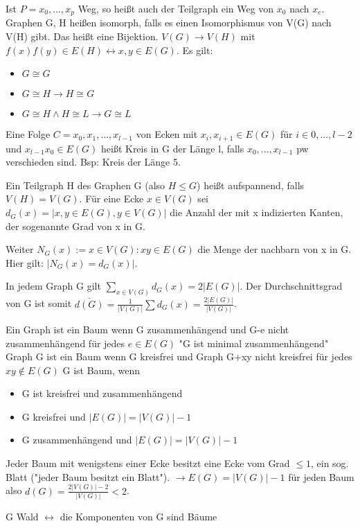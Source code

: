 \documentclass[a4paper]{article}
\begin{document}
\begin{multicols}{3}
    Ist $P=x_0,...,x_p$ Weg, so heißt auch der Teilgraph ein Weg von $x_0$ nach $x_e$.
    Graphen G, H heißen isomorph, falls es einen Isomorphismus von V(G) nach V(H) gibt. Das heißt eine Bijektion.
    $V(G)\rightarrow V(H)$ mit $f(x)f(y)\in E(H)\leftrightarrow x,y \in E(G)$. Es gilt:
    \begin{itemize}
        \item $G\cong G$
        \item $G\cong H \rightarrow H \cong G$
        \item $G\cong H \wedge H\cong L \rightarrow G\cong L$
    \end{itemize}
    
    Eine Folge $C=x_0,x_1,...,x_{l-1}$ von Ecken mit $x_i,x_{i+1}\in E(G)$ für $i\in {0,...,l-2}$ und $x_{l-1}x_0 \in E(G)$ heißt Kreis in G der Länge l, falls $x_0,...,x_{l-1}$ pw verschieden sind. Bsp: Kreis der Länge 5.
    
    Ein Teilgraph H des Graphen G (also $H\leq G$) heißt aufspannend, falls $V(H)=V(G)$. Für eine Ecke $x\in V(G)$ sei $d_G(x)=|{x,y\in E(G), y\in V(G)}|$ die Anzahl der mit x indizierten Kanten, der sogenannte Grad von x in G.
    
    Weiter $N_G(x):={x\in V(G): xy \in E(G)}$ die Menge der nachbarn von x in G. Hier gilt: $|N_G(x)=d_G(x)|$.
    
    In jedem Graph G gilt $\sum_{x\in V(G)} d_G(x)=2|E(G)|$. Der Durchschnittsgrad von G ist somit $\bar{d(G)}=\frac{1}{|V(G)|}\sum d_G(x)=\frac{2|E(G)|}{|V(G)|}$.
    
    Ein Graph ist ein Baum wenn G zusammenhängend und G-e nicht zusammenhängend für jedes $e\in E(G)$ "G ist minimal zusammenhängend"
    Graph G ist ein Baum wenn G kreisfrei und Graph G+xy nicht kreisfrei für jedes $xy \not\in E(G)$
    G ist Baum, wenn
    \begin{itemize}
        \item G ist kreisfrei und zusammenhängend
        \item G kreisfrei und $|E(G)|=|V(G)|-1$
        \item G zusammenhängend und $|E(G)|=|V(G)|-1$
    \end{itemize}
    
    Jeder Baum mit wenigstens einer Ecke besitzt eine Ecke vom Grad $\leq 1$, ein sog. Blatt ("jeder Baum besitzt ein Blatt").
    $\rightarrow E(G)=|V(G)|-1$ für jeden Baum also $d(G)=\frac{2|V(G)| -2}{|V(G)|}<2$.
    
    G Wald $\leftrightarrow$ die Komponenten von G sind Bäume
    

\end{multicols}
\end{document}
